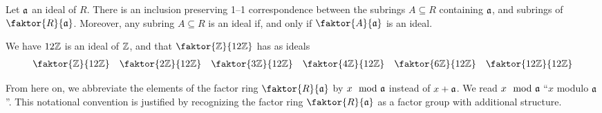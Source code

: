 \begin{theorem}\label{theorem_5.3.7}
  Let $\mathfrak{a}$ an ideal of $R$. There is an inclusion preserving 1--1
  correspondence between the subrings $A \subseteq R$ containing
  $\mathfrak{a}$, and subrings of $\faktor{R}{\af}$. Moreover, any subring $A
  \subseteq R$ is an ideal if, and only if $\faktor{A}{\af}$ is an
  ideal.
\end{theorem}

\begin{example}\label{example_5.11}
  We have $12\mathbb{Z}$ is an ideal of  $\mathbb{Z}$, and that  $\faktor{\Z}{12\Z}$ has as
  ideals
  \begin{align*}
    \faktor{\Z}{12\Z} && \faktor{2\Z}{12\Z} && \faktor{3\Z}{12\Z} &&
    \faktor{4\Z}{12\Z} && \faktor{6\Z}{12\Z} && \faktor{12\Z}{12\Z}
  \end{align*}
\end{example}

\begin{remark}
  From here on, we abbreviate the elements of the factor ring
  $\faktor{R}{\af}$ by $x \mod{\mathfrak{a}}$ instead of $x+\mathfrak{a}$. We read $x
  \mod{\mathfrak{a}}$ ``$x$ modulo $\mathfrak{a}$''. This notational convention is
  justified by recognizing the factor ring $\faktor{R}{\af}$ as a
  factor group with additional structure.
\end{remark}
